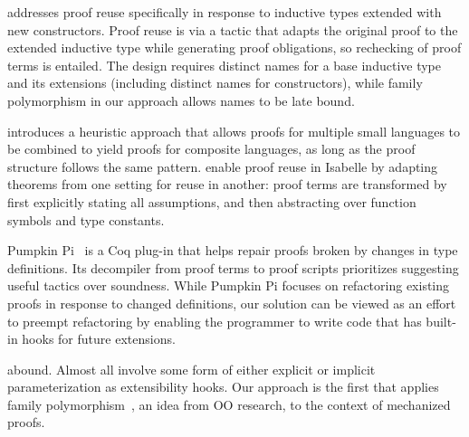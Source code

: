 
\citet{boite2004proof} addresses proof reuse specifically in response
to inductive types extended with new constructors. Proof reuse is
via a tactic that adapts the original proof to the extended inductive
type while generating proof obligations, so rechecking of proof terms is
entailed.
The design requires distinct names for a base inductive type and its
extensions (including distinct names for constructors), while family
polymorphism in our approach allows names to be late bound.

\citet{mulhern2006proof} introduces a heuristic approach that allows proofs
for multiple small languages to be combined to yield proofs for
composite languages, as long as the proof structure follows the same
pattern.
%
\citet{johlut2004} enable proof reuse in Isabelle by adapting theorems
from one setting for reuse in another: proof terms are transformed
by first explicitly stating all assumptions, and then abstracting over
function symbols and type constants.

Pumpkin Pi~\cite{ringer2021pumpkin} is a Coq plug-in that helps
repair proofs broken by changes in type definitions.
Its decompiler from proof terms to proof scripts prioritizes suggesting
useful tactics over soundness.
While Pumpkin Pi focuses on refactoring existing proofs in response to
changed definitions,
our solution can be viewed as an effort to preempt refactoring by
enabling the programmer to write code that has built-in hooks for
future extensions.

 \!abound.
Almost all involve some form of either explicit or implicit parameterization
as extensibility hooks.
Our approach is the first that applies family polymorphism~\cite{ernst2001family},
an idea from OO research,
to the context of mechanized proofs.


